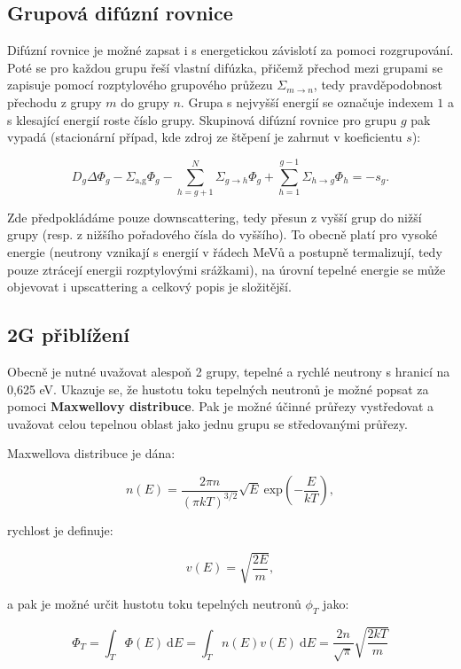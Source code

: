 \subsection{Grupová difúzní rovnice}

Difúzní rovnice je možné zapsat i s energetickou závislotí za pomoci rozgrupování. Poté se pro každou grupu řeší vlastní difúzka, přičemž přechod mezi grupami se zapisuje pomocí rozptylového grupového průžezu $\Sigma_{m \to n}$, tedy pravděpodobnost přechodu z grupy $m$ do grupy $n$. Grupa s nejvyšší energií se označuje indexem $1$ a s klesající energií roste číslo grupy. Skupinová difúzní rovnice pro grupu $g$ pak vypadá (stacionární případ, kde zdroj ze štěpení je zahrnut v koeficientu $s$):

\begin{equation}
    \boxed{
        D_g \Delta \Phi_g - \Sigma_\text{a,g} \Phi_g - \sum^N_{h=g+1} \Sigma_{g \to h} \Phi_g + \sum^{g-1}_{h=1} \Sigma_{h \to g} \Phi_h = -s_g.
    }
\end{equation}

Zde předpokládáme pouze downscattering, tedy přesun z vyšší grup do nižší grupy (resp. z nižšího pořadového čísla do vyššího). To obecně platí pro vysoké energie (neutrony vznikají s energií v řádech MeVů a postupně termalizují, tedy pouze ztrácejí energii rozptylovými srážkami), na úrovní tepelné energie se může objevovat i upscattering a celkový popis je složitější.

\subsection{2G přiblížení}

Obecně je nutné uvažovat alespoň 2 grupy, tepelné a rychlé neutrony s hranicí na 0,625 eV. Ukazuje se, že hustotu toku tepelných neutronů je možné popsat za pomoci \textbf{Maxwellovy distribuce}. Pak je možné účinné průřezy vystředovat a uvažovat celou tepelnou oblast jako jednu grupu se středovanými průřezy. 

Maxwellova distribuce je dána:

$$ n(E) = \dfrac{2 \pi n}{(\pi k T)^{3/2}} \sqrt{E} \: \text{exp} \left(- \dfrac{E}{kT}\right), $$

rychlost je definuje:

$$ v(E) = \sqrt{\dfrac{2E}{m}}, $$

a pak je možné určit hustotu toku tepelných neutronů $\phi_T$ jako:

$$ \Phi_T = \int_T \Phi(E) \: \text{d}E = \int_T n(E) v(E) \: \text{d}E = \dfrac{2n}{\sqrt{\pi}} \sqrt{\dfrac{2kT}{m}} $$

